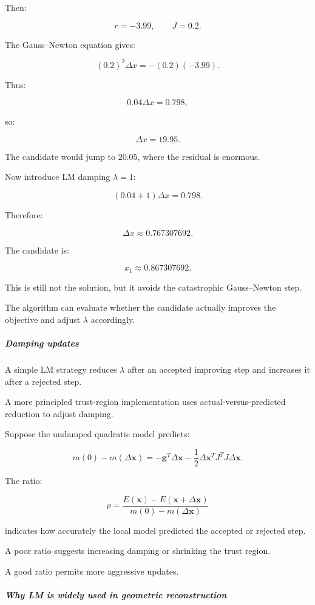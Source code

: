 Then:

\[
r=-3.99,\qquad J=0.2.
\]

The Gauss--Newton equation gives:

\[
(0.2)^2\Delta x=-(0.2)(-3.99).
\]

Thus:

\[
0.04\Delta x=0.798,
\]

so:

\[
\boxed{\Delta x=19.95}.
\]

The candidate would jump to \(20.05\), where the residual is enormous.

Now introduce LM damping \(\lambda=1\):

\[
(0.04+1)\Delta x=0.798.
\]

Therefore:

\[
\boxed{ \Delta x\approx0.767307692 }.
\]

The candidate is:

\[
x_1\approx0.867307692.
\]

This is still not the solution, but it avoids the catastrophic Gauss--Newton step.

The algorithm can evaluate whether the candidate actually improves the objective and adjust \(\lambda\) accordingly.

\subparagraph{Damping updates}\label{damping-updates}

A simple LM strategy reduces \(\lambda\) after an accepted improving step and increases it after a rejected step.

A more principled trust-region implementation uses actual-versus-predicted reduction to adjust damping.

Suppose the undamped quadratic model predicts:

\[
m(0)-m(\Delta\mathbf x) = -\mathbf g^T\Delta\mathbf x -\frac12\Delta\mathbf x^TJ^TJ\Delta\mathbf x.
\]

The ratio:

\[
\rho= \frac{ E(\mathbf x)-E(\mathbf x+\Delta\mathbf x) }{ m(0)-m(\Delta\mathbf x) }
\]

indicates how accurately the local model predicted the accepted or rejected step.

A poor ratio suggests increasing damping or shrinking the trust region.

A good ratio permits more aggressive updates.

\subparagraph{Why LM is widely used in geometric reconstruction}\label{why-lm-is-widely-used-in-geometric-reconstruction}

